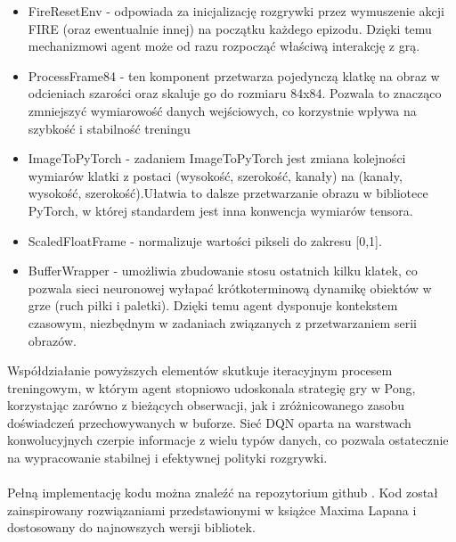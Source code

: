 \documentclass[a4paper, 12pt]{article}
\numberwithin{equation}{section}
\begin{document}
\begin{itemize}
        \item FireResetEnv - odpowiada za inicjalizację rozgrywki przez wymuszenie akcji FIRE (oraz ewentualnie innej) na początku każdego epizodu. Dzięki temu mechanizmowi agent może od razu rozpocząć właściwą interakcję z grą.
        \item ProcessFrame84 - ten komponent przetwarza pojedynczą klatkę na obraz w odcieniach szarości oraz skaluje go do rozmiaru 84x84. Pozwala to znacząco zmniejszyć wymiarowość danych wejściowych, co korzystnie wpływa na szybkość i stabilność treningu
        \item ImageToPyTorch - zadaniem ImageToPyTorch jest zmiana kolejności wymiarów klatki z postaci (wysokość, szerokość, kanały) na (kanały, wysokość, szerokość).Ułatwia to dalsze przetwarzanie obrazu w bibliotece PyTorch, w której standardem jest inna konwencja wymiarów tensora.
        \item ScaledFloatFrame - normalizuje wartości pikseli do zakresu [0,1].
        \item BufferWrapper - umożliwia zbudowanie stosu ostatnich kilku klatek, co pozwala sieci neuronowej wyłapać krótkoterminową dynamikę obiektów w grze (ruch piłki i paletki). Dzięki temu agent dysponuje kontekstem czasowym, niezbędnym w zadaniach związanych z przetwarzaniem serii obrazów.
    \end{itemize}
    Współdziałanie powyższych elementów skutkuje iteracyjnym procesem treningowym, w którym agent stopniowo udoskonala strategię gry w Pong, korzystając zarówno z bieżących obserwacji, jak i zróżnicowanego zasobu doświadczeń przechowywanych w buforze. Sieć DQN oparta na warstwach konwolucyjnych czerpie informacje z wielu typów danych, co pozwala ostatecznie na wypracowanie stabilnej i efektywnej polityki rozgrywki.
    \\ \\ 
    Pełną implementację kodu można znaleźć na repozytorium github \cite{DQN}.
    Kod został zainspirowany rozwiązaniami przedstawionymi w książce Maxima Lapana \cite{lapan2020deep} i dostosowany do najnowszych wersji bibliotek.
\end{document}
